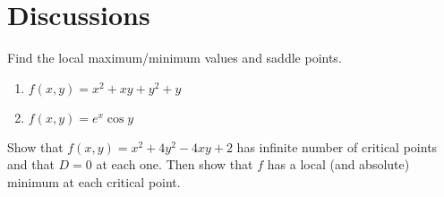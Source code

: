 \documentclass[12pt]{amsart}
\begin{document}
\section{Discussions}

\begin{problem}
Find the local maximum/minimum values and saddle points.

\begin{enumerate}
	\item $ f(x,y) = x^2 + xy + y^2 + y$
	      \vspace{7cm}
	\item $f(x,y) = e^x \cos y$
	      \vspace{7cm}
\end{enumerate}
\end{problem}


\begin{problem}
Show that $f(x,y) = x^2 + 4y^2 - 4xy +2$ has infinite number of critical points and that $D = 0$ at each one.
Then show that $f$ has a local (and absolute) minimum at each critical point.
\end{problem}
\end{document}
